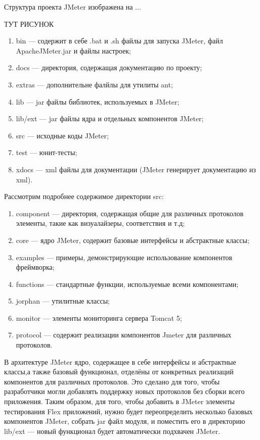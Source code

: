 Структура проекта JMeter изображена на ...

ТУТ РИСУНОК

\begin{enumerate}
\item bin --- содержит в себе .bat и .sh файлы для запуска JMeter, файл ApacheJMeter.jar и файлы настроек;
\item docs --- директория, содержащая документацию по проекту;
\item extras --- дополнительне фалйлы для утилиты ant;
\item lib --- jar файлы библиотек, используемых в JMeter;
\item lib/ext --- jar файлы ядра и отдельных компонентов JMeter;
\item src --- исходные коды JMeter;
\item test --- юнит-тесты;
\item xdocs --- xml файлы для документации (JMeter генерирует документацию из xml).
\end{enumerate}

Рассмотрим подробнее содержимое директории src:

\begin{enumerate}
\item component --- директория, содержащая общие для различных протоколов элементы, такие как визуалайзеры,
соответствия и т.д;
\item core --- ядро JMeter, содержит базовые интерфейсы и абстрактные классы;
\item examples --- примеры, демонстрирующие использование компонентов фреймворка;
\item functions --- стандартные функции, используемые всеми компонентами;
\item jorphan --- утилитные классы;
\item monitor --- элементы мониторинга сервера Tomcat 5;
\item protocol --- содержит реализации компонентов Jmeter для различных протоколов.
\end{enumerate}

В архитектуре JMeter ядро, содержащее в себе интерфейсы и абстрактные классы,а также базовый функционал,
отделёны от конкретных реализаций компонентов для различных протоколов. Это сделано для того, чтобы разработчики
могли добавлять поддержку новых протоколов без сборки всего приложения. Таким образом, для того, чтобы добавить
в JMeter элементы тестирования Flex приложений, нужно будет переопределить несколько базовых
компонентов JMeter, собрать jar файл модуля, и поместить его в директорию lib/ext --- новый функционал будет
автоматически подхвачен JMeter.


